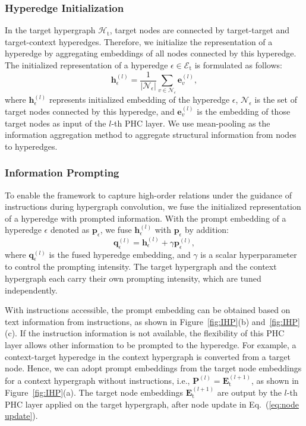 \subsubsection{Hyperedge Initialization}
In the target hypergraph $\mathcal{H}_\text{t}$, target nodes are connected by target-target and target-context hyperedges. 
Therefore, we initialize the representation of a hyperedge by aggregating embeddings of all nodes connected by this hyperedge. 
The initialized representation of a hyperedge $\epsilon\in \mathcal{E}_\text{t}$ is formulated as follows:
\begin{equation}\label{eq:initial}
    \mathbf{h}_\epsilon^{(l)} = \frac{1}{|\mathcal{N}_\epsilon|}\sum_{v\in\mathcal{N}_\epsilon}\mathbf{e}_{v}^{(l)},
\end{equation}
where $\mathbf{h}_\epsilon^{(l)}$ represents initialized embedding of the hyperedge $\epsilon$, $\mathcal{N}_\epsilon$ is the set of target nodes connected by this hyperedge, and $\mathbf{e}_{v}^{(l)}$ is the embedding of those target nodes as input of the $l$-th PHC layer.
We use mean-pooling as the information aggregation method to aggregate structural information from nodes to hyperedges.

\subsubsection{Information Prompting}
To enable the framework to capture high-order relations under the guidance of instructions during hypergraph convolution, we fuse the initialized representation of a hyperedge with prompted information. 
With the prompt embedding of a hyperedge $\epsilon$ denoted as $\mathbf{p}_\epsilon$, we fuse $\mathbf{h}_\epsilon^{(l)}$ with $\mathbf{p}_\epsilon$ by addition:
\begin{equation}\label{eq:info prompt}
    \mathbf{q}_\epsilon^{(l)} = \mathbf{h}_\epsilon^{(l)} + \gamma\mathbf{p}_{\epsilon}^{(l)},
\end{equation}
where $\mathbf{q}_\epsilon^{(l)}$ is the fused hyperedge embedding, and $\gamma$ is a scalar hyperparameter to control the prompting intensity. The target hypergraph and the context hypergraph each carry their own prompting intensity, which are tuned independently.

With instructions accessible, the prompt embedding can be obtained based on text information from instructions, as shown in Figure~\ref{fig:IHP}(b) and~\ref{fig:IHP}(c).
If the instruction information is not available, the flexibility of this PHC layer allows other information to be prompted to the hyperedge. 
For example, a context-target hyperedge in the context hypergraph is converted from a target node. 
Hence, we can adopt prompt embeddings from the target node embeddings for a context hypergraph without instructions, i.e., $\mathbf{P}^{(l)}=\mathbf{E}_\text{t}^{(l+1)}$, as shown in Figure~\ref{fig:IHP}(a). 
The target node embeddings $\mathbf{E}_\text{t}^{(l+1)}$ are output by the $l$-th PHC layer applied on the target hypergraph, after node update in Eq.~(\ref{eq:node update}).


